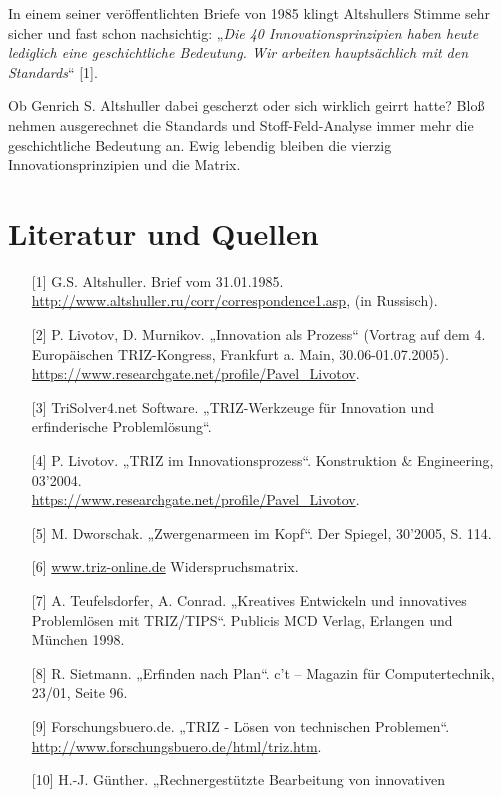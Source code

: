 \documentclass[11pt,a4paper]{article}
\begin{document}
In einem seiner veröffentlichten Briefe von 1985 klingt Altshullers Stimme
sehr sicher und fast schon nachsichtig: „\emph{Die 40 Innovationsprinzipien
  haben heute lediglich eine geschichtliche Bedeutung. Wir arbeiten
  hauptsächlich mit den Standards}“ [1].

Ob Genrich S. Altshuller dabei gescherzt oder sich wirklich geirrt hatte? Bloß
nehmen ausgerechnet die Standards und Stoff-Feld-Analyse immer mehr die
geschichtliche Bedeutung an. Ewig lebendig bleiben die vierzig
Innovationsprinzipien und die Matrix.

\section*{Literatur und Quellen}
\begin{itemize}
\item[{[1]}] G.S. Altshuller. Brief vom 31.01.1985.\\
  \url{http://www.altshuller.ru/corr/correspondence1.asp}, (in Russisch).
\item[{[2]}] P. Livotov, D. Murnikov. „Innovation als Prozess“ (Vortrag auf
  dem 4. Europäischen TRIZ-Kongress, Frankfurt a. Main, 30.06-01.07.2005).\\ 
  \url{https://www.researchgate.net/profile/Pavel_Livotov}.
\item[{[3]}] TriSolver4.net Software. „TRIZ-Werkzeuge für Innovation und
  erfinderische Problem\-lösung“.
\item[{[4]}] P. Livotov. „TRIZ im Innovationsprozess“. Konstruktion \&
  Engineering, 03'2004.\\
  \url{https://www.researchgate.net/profile/Pavel_Livotov}.
\item[{[5]}] M. Dworschak. „Zwergenarmeen im Kopf“. Der Spiegel, 30’2005,
  S. 114.
\item[{[6]}] \url{www.triz-online.de} Widerspruchsmatrix.
\item[{[7]}] A. Teufelsdorfer, A. Conrad. „Kreatives Entwickeln und
  innovatives Problemlösen mit TRIZ/TIPS“. Publicis MCD Verlag, Erlangen und
  München 1998.
\item[{[8]}] R. Sietmann. „Erfinden nach Plan“. c't -- Magazin für
  Computertechnik, 23/01, Seite 96.
\item[{[9]}] Forschungsbuero.de. „TRIZ - Lösen von technischen Problemen“.\\
  \url{http://www.forschungsbuero.de/html/triz.htm}.
\item[{[10]}] H.-J. Günther. „Rechnergestützte Bearbeitung von innovativen

\end{itemize}
\end{document}
